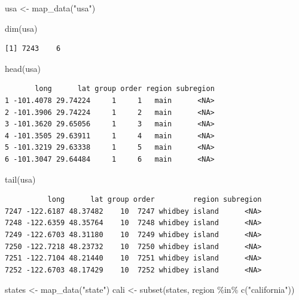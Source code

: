 \documentclass[
  letterpaper,
  DIV=11,
  numbers=noendperiod]{scrartcl}
\newenvironment{Shaded}{\begin{snugshade}}{\end{snugshade}}
\newcommand{\FunctionTok}[1]{\textcolor[rgb]{0.28,0.35,0.67}{#1}}
\newcommand{\NormalTok}[1]{\textcolor[rgb]{0.00,0.23,0.31}{#1}}
\newcommand{\OtherTok}[1]{\textcolor[rgb]{0.00,0.23,0.31}{#1}}
\newcommand{\SpecialCharTok}[1]{\textcolor[rgb]{0.37,0.37,0.37}{#1}}
\newcommand{\StringTok}[1]{\textcolor[rgb]{0.13,0.47,0.30}{#1}}
\begin{document}
\begin{Shaded}
\begin{Highlighting}[]
\NormalTok{usa }\OtherTok{\textless{}{-}} \FunctionTok{map\_data}\NormalTok{(}\StringTok{"usa"}\NormalTok{)}
\end{Highlighting}
\end{Shaded}

\begin{Shaded}
\begin{Highlighting}[]
\FunctionTok{dim}\NormalTok{(usa)}
\end{Highlighting}
\end{Shaded}

\begin{verbatim}
[1] 7243    6
\end{verbatim}

\begin{Shaded}
\begin{Highlighting}[]
\FunctionTok{head}\NormalTok{(usa)}
\end{Highlighting}
\end{Shaded}

\begin{verbatim}
       long      lat group order region subregion
1 -101.4078 29.74224     1     1   main      <NA>
2 -101.3906 29.74224     1     2   main      <NA>
3 -101.3620 29.65056     1     3   main      <NA>
4 -101.3505 29.63911     1     4   main      <NA>
5 -101.3219 29.63338     1     5   main      <NA>
6 -101.3047 29.64484     1     6   main      <NA>
\end{verbatim}

\begin{Shaded}
\begin{Highlighting}[]
\FunctionTok{tail}\NormalTok{(usa)}
\end{Highlighting}
\end{Shaded}

\begin{verbatim}
          long      lat group order         region subregion
7247 -122.6187 48.37482    10  7247 whidbey island      <NA>
7248 -122.6359 48.35764    10  7248 whidbey island      <NA>
7249 -122.6703 48.31180    10  7249 whidbey island      <NA>
7250 -122.7218 48.23732    10  7250 whidbey island      <NA>
7251 -122.7104 48.21440    10  7251 whidbey island      <NA>
7252 -122.6703 48.17429    10  7252 whidbey island      <NA>
\end{verbatim}

\begin{Shaded}
\begin{Highlighting}[]
\NormalTok{states }\OtherTok{\textless{}{-}} \FunctionTok{map\_data}\NormalTok{(}\StringTok{"state"}\NormalTok{)}
\NormalTok{cali }\OtherTok{\textless{}{-}} \FunctionTok{subset}\NormalTok{(states, region }\SpecialCharTok{\%in\%} \FunctionTok{c}\NormalTok{(}\StringTok{"california"}\NormalTok{))}
\end{Highlighting}
\end{Shaded}
\end{document}
